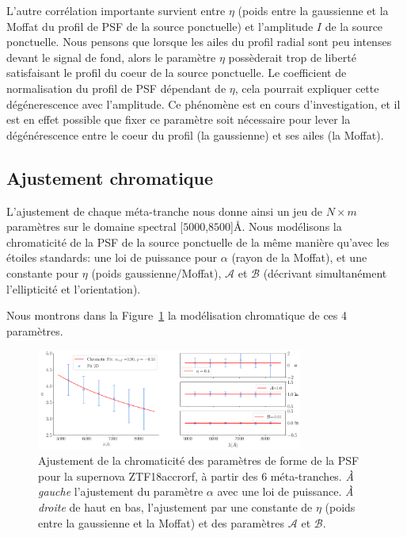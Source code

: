 \documentclass[../main/main.tex]{subfiles}
\begin{document}
L'autre corrélation importante survient entre $\eta$ (poids entre
la gaussienne et la Moffat du profil de PSF de la source ponctuelle) et
l'amplitude $I$ de la source ponctuelle. Nous pensons que
lorsque les ailes du profil radial sont peu
intenses devant le signal de fond, alors le paramètre $\eta$ possèderait
trop de liberté satisfaisant le profil du coeur de la source
ponctuelle. Le coefficient de normalisation du profil de PSF dépendant de $\eta$, cela
pourrait expliquer cette dégénerescence avec l'amplitude. Ce phénomène
est en cours d'investigation, et il est en effet possible que fixer ce
paramètre soit nécessaire pour lever la dégénérescence entre le coeur du profil (la gaussienne) et
ses ailes (la Moffat).

\subsection{Ajustement chromatique}
L'ajustement de chaque méta-tranche nous donne ainsi un jeu de $N\times m$
paramètres sur le domaine spectral [$5000$,$8500$]\AA. Nous modélisons
la chromaticité de la PSF de la source ponctuelle de la même manière
qu'avec les étoiles standards: une loi de puissance pour $\alpha$ (rayon
de la Moffat), et
une constante pour $\eta$ (poids gaussienne/Moffat), $\mathcal{A}$ et
$\mathcal{B}$ (décrivant simultanément l'ellipticité et l'orientation).

Nous montrons dans la Figure~\ref{fig:chromaticity_target} la
modélisation chromatique de ces 4 paramètres. 

\begin{figure}[ht]
  \centering
  \includegraphics[width=0.78\textwidth]{../figures/07_scene/chromaticity_targetZTF18accrorf.pdf}
  \caption[Chromaticité des paramètres de forme de la PSF de la supernova ZTF18accrorf]{Ajustement de
    la chromaticité
    des paramètres de forme de la PSF pour la supernova ZTF18accrorf, à
    partir des 6 méta-tranches. \emph{À gauche} l'ajustement du paramètre $\alpha$ avec une
    loi de puissance. \emph{À droite} de haut en bas, l'ajustement par une
    constante de $\eta$ (poids entre la gaussienne et la Moffat) et des
    paramètres $\mathcal{A}$ et $\mathcal{B}$. }
  \label{fig:chromaticity_target}
\end{figure}
\end{document}

